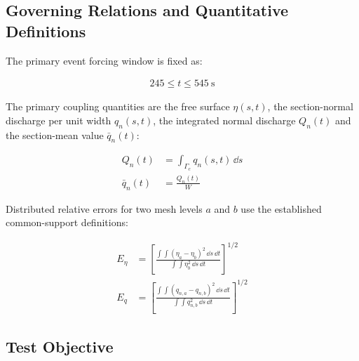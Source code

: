 %

\subsection{Governing Relations and Quantitative Definitions}
\label{sec:res-ver-cnv-governing-relations}

The primary event forcing window is fixed as:

\begin{align}
  245
  \le
  t
  \le
  545~\mathrm{s}
  \label{eq:res-ver-cnv-r10-forcing-window}
\end{align}

The primary coupling quantities are the free surface $\eta(s,t)$, the
section-normal discharge per unit width $q_n(s,t)$, the integrated
normal discharge $Q_n(t)$ and the section-mean value $\bar{q}_n(t)$:

\begin{align}
  Q_n(t)
  &=
  \int_{\Gamma_c}
  q_n(s,t)
  \,\dd s
  \label{eq:res-ver-cnv-integrated-discharge}
  \\
  \bar{q}_n(t)
  &=
  \frac{Q_n(t)}{W}
  \label{eq:res-ver-cnv-mean-normal-discharge}
\end{align}

Distributed relative errors for two mesh levels $a$ and $b$ use the
established common-support definitions:

\begin{align}
  E_{\eta}
  &=
  \left[
    \frac{
      \int\!\!\int
      \left(
        \eta_a-\eta_b
      \right)^2
      \,\dd s\,\dd t
    }{
      \int\!\!\int
      \eta_b^2
      \,\dd s\,\dd t
    }
  \right]^{1/2}
  \label{eq:res-ver-cnv-distributed-eta-error}
  \\
  E_q
  &=
  \left[
    \frac{
      \int\!\!\int
      \left(
        q_{n,a}-q_{n,b}
      \right)^2
      \,\dd s\,\dd t
    }{
      \int\!\!\int
      q_{n,b}^2
      \,\dd s\,\dd t
    }
  \right]^{1/2}
  \label{eq:res-ver-cnv-distributed-qn-error}
\end{align}

\subsection{Test Objective}
\label{sec:res-ver-cnv-test-objective}

